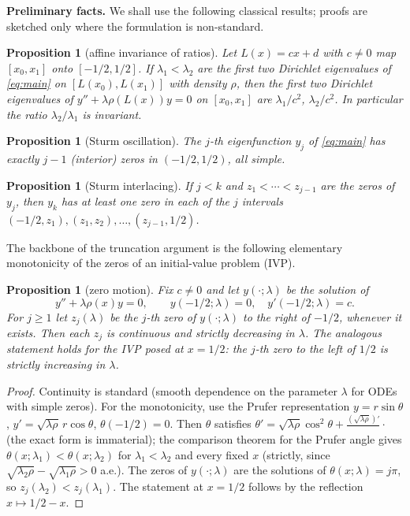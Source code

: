 ﻿\documentclass[11pt]{article}
\newtheorem{proposition}[theorem]{Proposition}
\begin{document}
\medskip
\noindent\textbf{Preliminary facts.}  We shall use the following classical
results; proofs are sketched only where the formulation is non-standard.

\begin{proposition}[affine invariance of ratios]\label{prop:affine}
	Let $L(x)=cx+d$ with $c\neq 0$ map $[x_0,x_1]$ onto $[-1/2,1/2]$.
	If $\lambda_1<\lambda_2$ are the first two Dirichlet eigenvalues of
	\eqref{eq:main} on $[L(x_0),L(x_1)]$ with density $\rho$, then the first
	two Dirichlet eigenvalues of $y''+\lambda\rho(L(x))y=0$ on $[x_0,x_1]$
	are $\lambda_1/c^2$, $\lambda_2/c^2$.  In particular the ratio
	$\lambda_2/\lambda_1$ is invariant.
\end{proposition}

\begin{proposition}[Sturm oscillation]\label{prop:osc}
	The $j$-th eigenfunction $y_j$ of \eqref{eq:main} has exactly $j-1$
	(interior) zeros in $(-1/2,1/2)$, all simple.
\end{proposition}

\begin{proposition}[Sturm interlacing]\label{prop:interl}
	If $j<k$ and $z_1<\cdots<z_{j-1}$ are the zeros of $y_j$, then $y_k$ has
	at least one zero in each of the $j$ intervals
	$(-1/2,z_1),(z_1,z_2),\ldots,(z_{j-1},1/2)$.
\end{proposition}

The backbone of the truncation argument is the following elementary
monotonicity of the zeros of an initial-value problem (IVP).

\begin{proposition}[zero motion]\label{prop:zeromotion}
	Fix $c\neq 0$ and let $y(\cdot;\lambda)$ be the solution of
	\begin{equation*}
		y''+\lambda\rho(x)y=0,\qquad y(-1/2;\lambda)=0,\quad
		y'(-1/2;\lambda)=c.
	\end{equation*}
	For $j\ge 1$ let $z_j(\lambda)$ be the $j$-th zero of $y(\cdot;\lambda)$
	to the right of $-1/2$, whenever it exists.  Then each $z_j$ is
	continuous and \emph{strictly decreasing} in $\lambda$.  The analogous
	statement holds for the IVP posed at $x=1/2$: the $j$-th zero to the
	left of $1/2$ is strictly increasing in $\lambda$.
\end{proposition}

\begin{proof}
	Continuity is standard (smooth dependence on the parameter $\lambda$
	for ODEs with simple zeros).  For the monotonicity, use the Prufer
	representation $y=r\sin\theta$, $y'=\sqrt{\lambda\rho}\,r\cos\theta$,
	$\theta(-1/2)=0$.  Then $\theta$ satisfies
	$\theta'=\sqrt{\lambda\rho}\cos^2\theta+\frac{(\sqrt{\lambda\rho})'}{}
	\cdot$ (the exact form is immaterial); the comparison theorem for the
	Prufer angle gives $\theta(x;\lambda_1)<\theta(x;\lambda_2)$ for
	$\lambda_1<\lambda_2$ and every fixed $x$ (strictly, since
	$\sqrt{\lambda_2\rho}-\sqrt{\lambda_1\rho}>0$ a.e.).  The zeros of
	$y(\cdot;\lambda)$ are the solutions of $\theta(x;\lambda)=j\pi$, so
	$z_j(\lambda_2)<z_j(\lambda_1)$.  The statement at $x=1/2$ follows by
	the reflection $x\mapsto 1/2-x$.
\end{proof}
\end{document}

